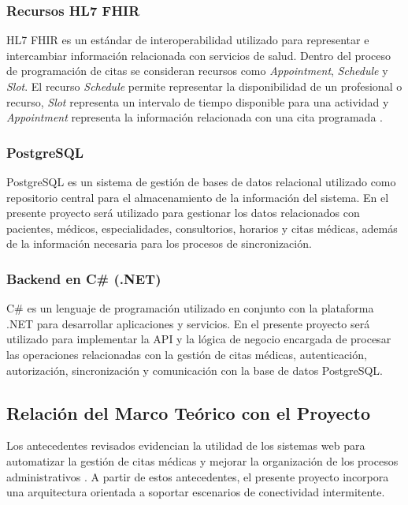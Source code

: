 \subsubsection{Recursos HL7 FHIR}

HL7 FHIR es un estándar de interoperabilidad utilizado para representar e intercambiar información relacionada con servicios de salud. Dentro del proceso de programación de citas se consideran recursos como \textit{Appointment}, \textit{Schedule} y \textit{Slot}. El recurso \textit{Schedule} permite representar la disponibilidad de un profesional o recurso, \textit{Slot} representa un intervalo de tiempo disponible para una actividad y \textit{Appointment} representa la información relacionada con una cita programada \parencite{santenet2026}.

\subsubsection{PostgreSQL}

PostgreSQL es un sistema de gestión de bases de datos relacional utilizado como repositorio central para el almacenamiento de la información del sistema. En el presente proyecto será utilizado para gestionar los datos relacionados con pacientes, médicos, especialidades, consultorios, horarios y citas médicas, además de la información necesaria para los procesos de sincronización.

\subsubsection{Backend en C\# (.NET)}

C\# es un lenguaje de programación utilizado en conjunto con la plataforma .NET para desarrollar aplicaciones y servicios. En el presente proyecto será utilizado para implementar la API y la lógica de negocio encargada de procesar las operaciones relacionadas con la gestión de citas médicas, autenticación, autorización, sincronización y comunicación con la base de datos PostgreSQL.

\subsection{Relación del Marco Teórico con el Proyecto}

Los antecedentes revisados evidencian la utilidad de los sistemas web para automatizar la gestión de citas médicas y mejorar la organización de los procesos administrativos \parencite{diaz2019,herrera2021,nolasco2019}. A partir de estos antecedentes, el presente proyecto incorpora una arquitectura orientada a soportar escenarios de conectividad intermitente.

